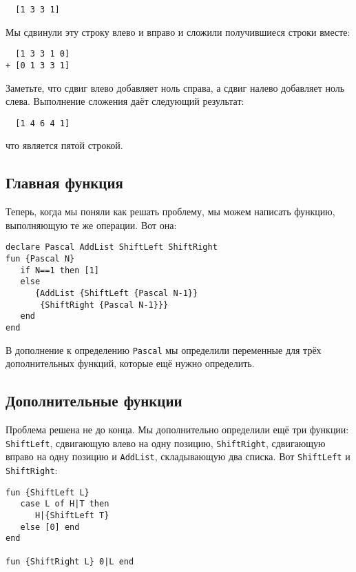 \begin{lstlisting}
  [1 3 3 1]
\end{lstlisting}

Мы сдвинули эту строку влево и вправо и сложили получившиеся строки вместе:

\begin{lstlisting}
  [1 3 3 1 0]
+ [0 1 3 3 1]
\end{lstlisting}

Заметьте, что сдвиг влево добавляет ноль справа, а сдвиг налево добавляет ноль слева. Выполнение сложения даёт следующий результат:

\begin{lstlisting}
  [1 4 6 4 1]
\end{lstlisting}

что является пятой строкой.

\subsection{Главная функция}\label{subsection:The_main_function}

Теперь, когда мы поняли как решать проблему, мы можем написать функцию, выполняющую те же операции. Вот она:

\begin{lstlisting}
declare Pascal AddList ShiftLeft ShiftRight
fun {Pascal N}
   if N==1 then [1]
   else
      {AddList {ShiftLeft {Pascal N-1}}
       {ShiftRight {Pascal N-1}}}
   end
end
\end{lstlisting}

В дополнение к определению \lstinline|Pascal| мы определили переменные для трёх дополнительных функций, которые ещё нужно определить.

\subsection{Дополнительные функции}\label{subsection:The_auxiliary_functions}

Проблема решена не до конца. Мы дополнительно определили ещё три функции: \lstinline|ShiftLeft|, сдвигающую влево на одну позицию, \lstinline|ShiftRight|, сдвигающую вправо на одну позицию и \lstinline|AddList|, складывающую два списка. Вот \lstinline|ShiftLeft| и \lstinline|ShiftRight|:

\begin{lstlisting}
fun {ShiftLeft L}
   case L of H|T then
      H|{ShiftLeft T}
   else [0] end
end

fun {ShiftRight L} 0|L end
\end{lstlisting}

